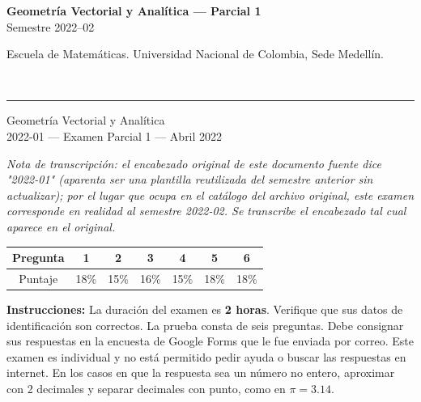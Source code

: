 \documentclass[11pt]{article}
\newcommand{\nota}[1]{{\small\itshape\color{unalblue!70!black} #1}}
\begin{document}
\noindent
\begin{minipage}[t]{0.6\linewidth}
{\small\bfseries Geometría Vectorial y Analítica --- Parcial 1}\\
{\small Semestre 2022--02}
\end{minipage}%
\hfill
\begin{minipage}[t]{0.35\linewidth}
\raggedleft\small Escuela de Matemáticas. Universidad Nacional de Colombia, Sede Medellín.
\end{minipage}\\[2pt]
\rule{\linewidth}{0.6pt}

\vspace{6pt}
\noindent Geometría Vectorial y Analítica\\
2022-01 --- Examen Parcial 1 --- Abril 2022

\vspace{4pt}
\nota{Nota de transcripción: el encabezado original de este documento fuente dice "2022-01" (aparenta ser una plantilla reutilizada del semestre anterior sin actualizar); por el lugar que ocupa en el catálogo del archivo original, este examen corresponde en realidad al semestre 2022-02. Se transcribe el encabezado tal cual aparece en el original.}

\vspace{6pt}
\begin{center}
\begin{tabular}{|c|c|c|c|c|c|c|}
\hline
Pregunta & 1 & 2 & 3 & 4 & 5 & 6 \\
\hline
Puntaje & 18\% & 15\% & 16\% & 15\% & 18\% & 18\% \\
\hline
\end{tabular}
\end{center}

\vspace{10pt}
\textbf{Instrucciones:} La duración del examen es \textbf{2 horas}. Verifique que sus datos de identificación son correctos. La prueba consta de seis preguntas. Debe consignar sus respuestas en la encuesta de Google Forms que le fue enviada por correo. Este examen es individual y no está permitido pedir ayuda o buscar las respuestas en internet. En los casos en que la respuesta sea un número no entero, aproximar con 2 decimales y separar decimales con punto, como en $\pi=3.14$.
\end{document}
